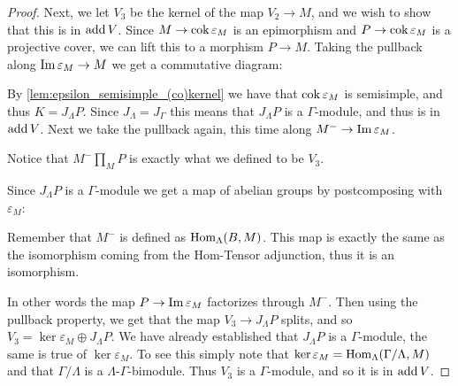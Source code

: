 \begin{theorem}
\begin{proof}
		Next, we let $V_3$ be the kernel of the map $V_2 \to M$, and we wish to show that this is in $\operatorname{add} V$. Since $M \to \operatorname{cok}\varepsilon_M$ is an epimorphism and $P \to \operatorname{cok}\varepsilon_M$ is a projective cover, we can lift this to a morphism $P \to M$. Taking the pullback along $\operatorname{Im} \varepsilon_M \to M$ we get a commutative diagram:
		\begin{center}
		\end{center} 
		By \cref{lem:epsilon_semisimple_(co)kernel} we have that $ \operatorname{cok}\varepsilon_M $ is semisimple, and thus $K = J_\Lambda P$. Since $J_\Lambda=J_\Gamma$ this means that $J_\Lambda P$ is a $\Gamma$-module, and thus is in $\operatorname{add} V$. Next we take the pullback again, this time along $M^- \to \operatorname{Im} \varepsilon_M$. 
		\begin{center}
		\end{center} 
		Notice that $M^-\prod\limits_M P$ is exactly what we defined to be $V_3$.
		
		Since $J_\Lambda P$ is a $\Gamma$-module we get a map of abelian groups by postcomposing with $\varepsilon_M$:
		\begin{center}
		\end{center} 
		Remember that $M^-$ is defined as $\operatorname{Hom}_\Lambda(B, M)$. This map is exactly the same as the isomorphism coming from the Hom-Tensor adjunction, thus it is an isomorphism.
		\begin{center}
		\end{center} 
		In other words the map $P \to \operatorname{Im} \varepsilon_M$ factorizes through $M^-$. Then using the pullback property, we get that the map $V_3 \to J_\Lambda P$ splits, and so $V_3 = \ker\varepsilon_M \oplus J_\Lambda P$. We have already established that $J_\Lambda P$ is a $\Gamma$-module, the same is true of $\ker\varepsilon_M$. To see this simply note that $\ker\varepsilon_M = \operatorname{Hom}_\Lambda(\Gamma/\Lambda, M)$ and that $\Gamma/\Lambda$ is a $\Lambda$-$\Gamma$-bimodule. Thus $V_3$ is a $\Gamma$-module, and so it is in $\operatorname{add} V$.
		

\end{proof}
\end{theorem}
